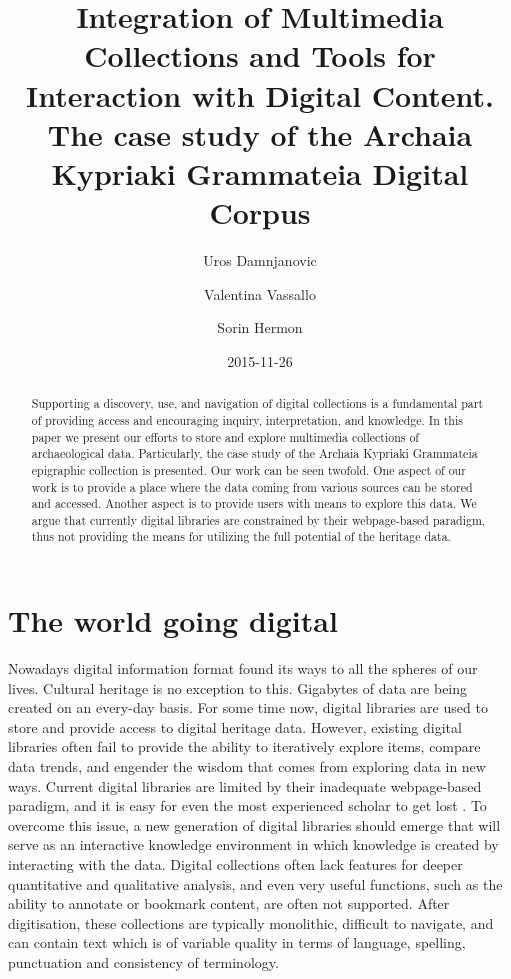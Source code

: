 \documentclass[amsthm,ebook]{saparticle}
\title{Integration of Multimedia Collections and Tools
for Interaction with Digital Content. The case study of the Archaia Kypriaki Grammateia Digital Corpus}
\author[cyi]{Uros Damnjanovic}
\author[cyi]{Valentina Vassallo\corref{first}}
\author[cyi]{Sorin Hermon}
\date{2015-11-26}
\begin{document}
\maketitle
\begin{abstract}
Supporting a discovery, use, and navigation of digital collections is a fundamental part of providing access and
encouraging inquiry, interpretation, and knowledge. In this paper we present our efforts to store and explore
multimedia collections of archaeological data. Particularly, the case study of the Archaia Kypriaki Grammateia
epigraphic collection is presented. Our work can be seen twofold. One aspect of our work is to provide a place where
the data coming from various sources can be stored and accessed. Another aspect is to provide users with means to explore
this data. We argue that currently digital libraries are constrained by their webpage-based paradigm, thus not
providing the means for utilizing the full potential of the heritage data.
\end{abstract}

\section{The world going digital}


\noindent Nowadays digital information format found its ways to all the spheres of our lives. Cultural heritage is no exception to
this. Gigabytes of data are being created on an every-day basis. For some time now, digital libraries are used to store
and provide access to digital heritage data. However, existing digital libraries often fail to provide the ability to
iteratively explore items, compare data trends, and engender the wisdom that comes from exploring data in new ways.
Current digital libraries are limited by their inadequate webpage-based paradigm, and it is easy for even the most
experienced scholar to get lost \citep{augmenting_2009}.
To overcome this issue, a new generation of digital
libraries should emerge that will serve as an interactive knowledge environment in which knowledge is created by
interacting with the data. Digital collections often lack features for deeper quantitative and qualitative analysis,
and even very useful functions, such as the ability to annotate or bookmark content, are often not supported. After
digitisation, these collections are typically monolithic, difficult to navigate, and can contain text which is of
variable quality in terms of language, spelling, punctuation and consistency of terminology. 
\end{document}
